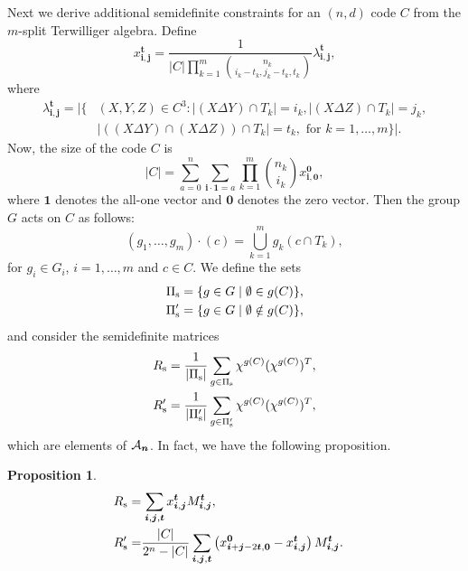 \documentclass[final,onecolumn]{IEEEtran}
\newtheorem{propositionenv}[definitionenv]{Proposition}
\newenvironment{proposition}{\begin{propositionenv}\rm}{\end{propositionenv}}
\theoremstyle{definition}
\newcommand{\bmo}{{\bm 0}}
\newcommand{\bml}{{\bm 1}}
\newcommand{\bmi}{{\bm i}}
\newcommand{\bmj}{{\bm j}}
\newcommand{\bmn}{{\bm n}}
\newcommand{\bms}{{\bm s}}
\newcommand{\bmt}{{\bm t}}
\begin{document}
Next we derive additional semidefinite constraints for an $(n,d)$ code $C$ from the $m$-split Terwilliger algebra. Define
\begin{equation}
	x_{\bmi, \bmj}^{\bmt} = \frac{1}{\lvert C\rvert \prod_{k = 1}^{m}\binom{n_{k}}{i_{k}-t_{k}, j_{k}-t_{k}, t_{k}}} \lambda^{\bmt}_{\bmi, \bmj},
\end{equation}
where
\begin{equation}
	\begin{aligned}
		\lambda^{\bmt}_{\bmi, \bmj} =  \lvert \{&(X, Y, Z) \in C^{3} : \lvert (X \Delta Y)\cap T_{k}\rvert = i_{k}, \lvert(X \Delta Z)\cap T_{k}\rvert = j_{k},  \\
		&\lvert((X \Delta Y)\cap (X \Delta Z))\cap T_{k}\rvert = t_{k}, \text{ for } k=1,\dots, m \} \rvert.
	\end{aligned}
\end{equation}
Now, the size of the code $C$ is 
\begin{equation*}
	\lvert C\rvert=\sum_{a = 0}^{n} \sum_{\bmi \cdot \bml = a} \prod_{k = 1}^{m} \binom{n_{k}}{i_{k}} x_{\bmi, \bmo}^{\bmo},
\end{equation*}
where $\bml$ denotes the all-one vector and  $\bmo$ denotes the zero vector. Then   the group $G$ acts on $C$ as follows:
\begin{equation*}
	(g_{1}, \dots, g_{m}) \cdot (c) = \bigcup_{k=1}^{m} g_{k}(c \cap T_{k}),
\end{equation*}
for $g_{i} \in G_{i}$, $i = 1, \dots, m$ and $c \in C$. We define the sets
\begin{align*}
	& \Pi_{\rm \bms} = \{g \in G \mid \emptyset \in g(C)\},\\
	& \Pi_{\rm \bms}' = \{g \in G \mid \emptyset \notin g(C)\},
\end{align*}
and consider the semidefinite matrices
\begin{align*}
	& R_{\rm \bms} = \frac{1}{\lvert \Pi_{\rm \bms}\rvert} \sum_{g \in \Pi_{\rm \bms}} \chi^{g(C)} (\chi^{g(C)})^{T}, \\
	& R_{\rm \bms}' = \frac{1}{\lvert \Pi_{\rm \bms}'\rvert}\sum_{g \in \Pi_{\rm \bms}'} \chi^{g(C)} (\chi^{g(C)})^{T},
\end{align*}
which are elements of ${\cal A}_{\bmn}$. In fact, we have the following proposition.
\begin{proposition}
	\label{pro:R_g}
	\begin{equation*}
		\begin{aligned}
			&R_{\rm \bms} = \sum_{\bmi, \bmj, \bmt} x_{\bmi, \bmj}^{\bmt}M_{\bmi, \bmj}^{\bmt},\\
			& 
			\begin{aligned}
				R_{\rm \bms}' =& \frac{\lvert C\rvert}{2^{n}-\lvert C\rvert}\sum_{\bmi, \bmj, \bmt} \left( x_{\bmi+\bmj-2\bmt, \bmo}^{\bmo}-x_{\bmi, \bmj}^{\bmt}\right)M_{\bmi, \bmj}^{\bmt}.
			\end{aligned}
		\end{aligned}
	\end{equation*}
\end{proposition}
	
\end{document}
